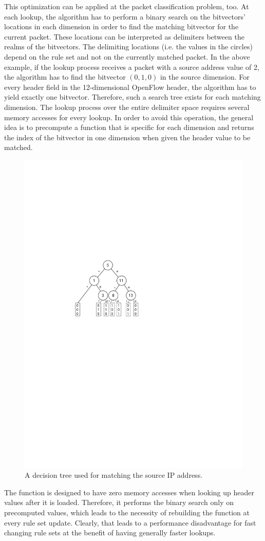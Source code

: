 \documentclass[conference]{IEEEtran}
\begin{document}
This optimization can be applied at the packet classification problem, too.
At each lookup, the algorithm has to perform a binary search on the bitvectors' 
locations in each dimension in order to find the matching bitvector for the current packet.
These locations can be interpreted as delimiters between the realms of the bitvectors.
The delimiting locations (i.e. the values in the circles) depend on the 
rule set and not on the currently matched packet.
In the above example, if the lookup process receives a packet with a source
address value of 2, the algorithm has to find the bitvector $(0, 1, 0)$ in the source dimension.
For every header field in the 12-dimensional OpenFlow header, the algorithm has to yield exactly one bitvector.
Therefore, such a search tree exists for each matching dimension.
The lookup process over the entire delimiter space requires several memory accesses for every lookup.
In order to avoid this operation, the general idea is to precompute a function that 
is specific for each dimension and returns the index of the bitvector in one 
dimension when given the header value to be matched.

\begin{figure}
\centering
\includegraphics[width=0.42\linewidth]{images/bv-tree-simple}
\caption{A decision tree used for matching the source IP address.}
\label{fig:bv-tree}
\end{figure}

The function is designed to have zero memory accesses when looking up header 
values after it is loaded.
Therefore, it performs the binary search only on precomputed values, which 
leads to the necessity of rebuilding the function at every rule set update.
Clearly, that leads to a performance disadvantage for fast changing rule sets at the benefit of having generally faster lookups.
\end{document}
